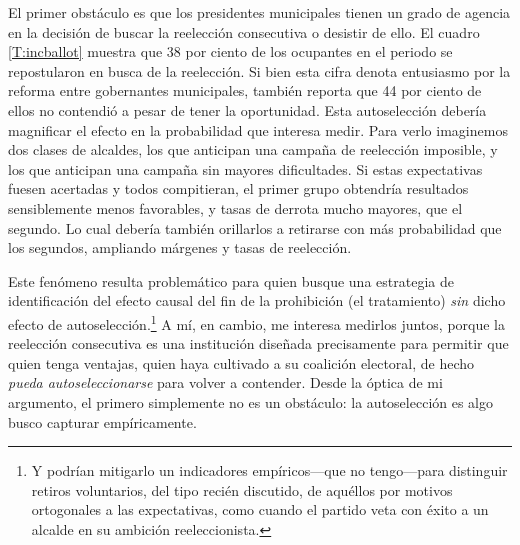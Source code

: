 \documentclass[letter,12pt]{article}
\newcommand{\mc}{\multicolumn}
\begin{document}
\noindent El primer obstáculo es que los presidentes municipales tienen un grado de agencia en la decisión de buscar la reelección consecutiva o desistir de ello. El cuadro \ref{T:incballot} muestra que 38 por ciento de los ocupantes en el periodo se repostularon en busca de la reelección. Si bien esta cifra denota entusiasmo por la reforma entre gobernantes municipales, también reporta que 44 por ciento de ellos no contendió a pesar de tener la oportunidad. Esta autoselección debería magnificar el efecto en la probabilidad que interesa medir. Para verlo imaginemos dos clases de alcaldes, los que anticipan una campaña de reelección imposible, y los que anticipan una campaña sin mayores dificultades. Si estas expectativas fuesen acertadas y todos compitieran, el primer grupo obtendría resultados sensiblemente menos favorables, y tasas de derrota mucho mayores, que el segundo. Lo cual debería también orillarlos a retirarse con más probabilidad que los segundos, ampliando márgenes y tasas de reelección.

Este fenómeno resulta problemático para quien busque una estrategia de identificación del efecto causal del fin de la prohibición (el tratamiento) \emph{sin} dicho efecto de autoselección.\footnote{Y podrían mitigarlo un indicadores empíricos---que no tengo---para distinguir retiros voluntarios, del tipo recién discutido, de aquéllos por motivos ortogonales a las expectativas, como cuando el partido veta con éxito a un alcalde en su ambición reeleccionista.} A mí, en cambio, me interesa medirlos juntos, porque la reelección consecutiva es una institución diseñada precisamente para permitir que quien tenga ventajas, quien haya cultivado a su coalición electoral, de hecho \emph{pueda autoseleccionarse} para volver a contender. Desde la óptica de mi argumento, el primero simplemente no es un obstáculo: la autoselección es algo busco capturar empíricamente.

\end{document}

